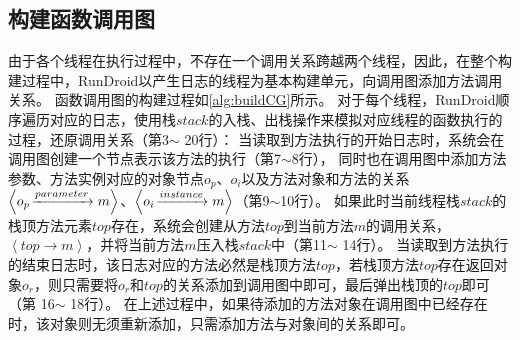 \subsection{构建函数调用图}


由于各个线程在执行过程中，不存在一个调用关系跨越两个线程，因此，在整个构建过程中，RunDroid以产生日志的线程为基本构建单元，向调用图添加方法调用关系。
函数调用图的构建过程如\autoref{alg:buildCG}所示。
对于每个线程，RunDroid顺序遍历对应的日志，使用栈$stack$的入栈、出栈操作来模拟对应线程的函数执行的过程，还原调用关系（第3$\sim$ 20行）：
当读取到方法执行的开始日志时，系统会在调用图创建一个节点表示该方法的执行（第7$\sim$8行），
同时也在调用图中添加方法参数、方法实例对应的对象节点$o_p$、$o_i$以及方法对象和方法的关系$ \left\langle  o_p \joinrel\xrightarrow{parameter}   m \right\rangle   $、$ \left\langle   o_i \joinrel\xrightarrow{instance}   m \right\rangle  $（第9$\sim$10行）。
如果此时当前线程栈$stack$的栈顶方法元素$top$存在，系统会创建从方法$top$到当前方法$m$的调用关系，$\left\langle top \to m \right \rangle  $，并将当前方法$m$压入栈$stack$中（第11$\sim$ 14行）。
当读取到方法执行的结束日志时，该日志对应的方法必然是栈顶方法$top$，若栈顶方法$top$存在返回对象$o_r$，则只需要将$o_r$和$top$的关系添加到调用图中即可，最后弹出栈顶的$top$即可（第 16$\sim$ 18行）。
在上述过程中，如果待添加的方法对象在调用图中已经存在时，该对象则无须重新添加，只需添加方法与对象间的关系即可。





